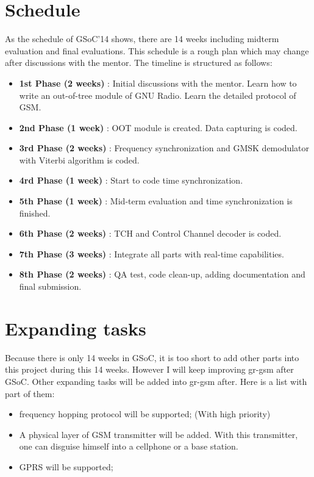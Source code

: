 \documentclass[a4paper,12pt,oneside]{article}
\begin{document}
\section{Schedule}
As the schedule of GSoC'14 shows, there are 14 weeks including midterm evaluation and final evaluations. This schedule is a rough plan which may change after discussions with the mentor. The timeline is structured as follows:
\begin{itemize}
\item \textbf{1st Phase (2 weeks)} : Initial discussions with the mentor. Learn how to write an out-of-tree module of GNU Radio. Learn the detailed protocol of GSM.
\item \textbf{2nd Phase (1 week)} : OOT module is created. Data capturing is coded.
\item \textbf{3rd Phase (2 weeks)} : Frequency synchronization and GMSK demodulator with Viterbi algorithm is coded.
\item \textbf{4rd Phase (1 week)} : Start to code time synchronization.
\item \textbf{5th Phase (1 week)} : Mid-term evaluation and time synchronization is finished.
\item \textbf{6th Phase (2 weeks)} : TCH and Control Channel decoder is coded.
\item \textbf{7th Phase (3 weeks)} : Integrate all parts with real-time capabilities.
\item \textbf{8th Phase (2 weeks)} : QA test, code clean-up, adding documentation and final submission.

\end{itemize}
\section{Expanding tasks}
Because there is only 14 weeks in GSoC, it is too short to add other parts into this project during this 14 weeks. However I will keep improving gr-gsm after GSoC. Other expanding tasks will be added into gr-gsm after. Here is a list with part of them:

\begin{itemize}
\item frequency hopping protocol will be supported; (With high priority)
\item A physical layer of GSM transmitter will be added. With this transmitter, one can disguise himself into a cellphone or a base station.
\item GPRS will be supported;
\end{itemize}
\end{document}
